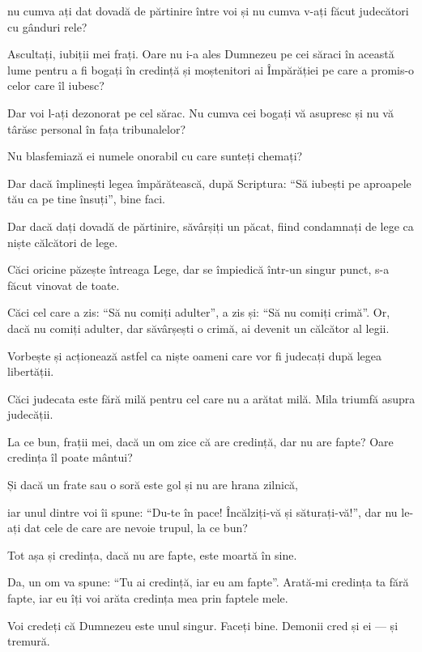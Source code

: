 {nu cumva ați dat dovadă de părtinire între voi și nu cumva v-ați făcut judecători cu gânduri rele?

Ascultați, iubiții mei frați. Oare nu i-a ales Dumnezeu pe cei săraci în această lume pentru a fi bogați în credință și moștenitori ai Împărăției pe care a promis-o celor care îl iubesc?

Dar voi l-ați dezonorat pe cel sărac. Nu cumva cei bogați vă asupresc și nu vă târăsc personal în fața tribunalelor?

Nu blasfemiază ei numele onorabil cu care sunteți chemați?


\par }{\PP {}Dar dacă împlinești legea împărătească, după Scriptura: “Să iubești pe aproapele tău ca pe tine însuți”, bine faci.

Dar dacă dați dovadă de părtinire, săvârșiți un păcat, fiind condamnați de lege ca niște călcători de lege.

Căci oricine păzește întreaga Lege, dar se împiedică într-un singur punct, s-a făcut vinovat de toate.

Căci cel care a zis: “Să nu comiți adulter”, a zis și: “Să nu comiți crimă”. Or, dacă nu comiți adulter, dar săvârșești o crimă, ai devenit un călcător al legii.

Vorbește și acționează astfel ca niște oameni care vor fi judecați după legea libertății.

Căci judecata este fără milă pentru cel care nu a arătat milă. Mila triumfă asupra judecății.


\par }{\PP {}La ce bun, frații mei, dacă un om zice că are credință, dar nu are fapte? Oare credința îl poate mântui?

Și dacă un frate sau o soră este gol și nu are hrana zilnică,

iar unul dintre voi îi spune: “Du-te în pace! Încălziți-vă și săturați-vă!”, dar nu le-ați dat cele de care are nevoie trupul, la ce bun?

Tot așa și credința, dacă nu are fapte, este moartă în sine.

Da, un om va spune: “Tu ai credință, iar eu am fapte”. Arată-mi credința ta fără fapte, iar eu îți voi arăta credința mea prin faptele mele.


\par }{\PP {}Voi credeți că Dumnezeu este unul singur. Faceți bine. Demonii cred și ei — și tremură.

}
